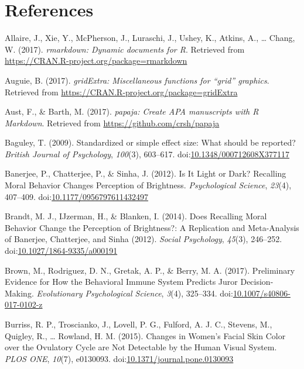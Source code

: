 \documentclass[english,floatsintext,man]{apa6}
\theoremstyle{definition}
\theoremstyle{definition}
\theoremstyle{definition}
\theoremstyle{remark}
\begin{document}
\newpage

\section{References}\label{references}

\setlength{\parindent}{-0.5in} \setlength{\leftskip}{0.5in}

\hypertarget{refs}{}
\hypertarget{ref-R-rmarkdown}{}
Allaire, J., Xie, Y., McPherson, J., Luraschi, J., Ushey, K., Atkins,
A., \ldots{} Chang, W. (2017). \emph{rmarkdown: Dynamic documents for
R}. Retrieved from \url{https://CRAN.R-project.org/package=rmarkdown}

\hypertarget{ref-R-gridExtra}{}
Auguie, B. (2017). \emph{gridExtra: Miscellaneous functions for ``grid''
graphics}. Retrieved from
\url{https://CRAN.R-project.org/package=gridExtra}

\hypertarget{ref-R-papaja}{}
Aust, F., \& Barth, M. (2017). \emph{papaja: Create APA manuscripts with
R Markdown}. Retrieved from \url{https://github.com/crsh/papaja}

\hypertarget{ref-Baguley2009}{}
Baguley, T. (2009). Standardized or simple effect size: What should be
reported? \emph{British Journal of Psychology}, \emph{100}(3), 603--617.
doi:\href{https://doi.org/10.1348/000712608X377117}{10.1348/000712608X377117}

\hypertarget{ref-Banerjee2012}{}
Banerjee, P., Chatterjee, P., \& Sinha, J. (2012). Is It Light or Dark?
Recalling Moral Behavior Changes Perception of Brightness.
\emph{Psychological Science}, \emph{23}(4), 407--409.
doi:\href{https://doi.org/10.1177/0956797611432497}{10.1177/0956797611432497}

\hypertarget{ref-Brandt2014}{}
Brandt, M. J., IJzerman, H., \& Blanken, I. (2014). Does Recalling Moral
Behavior Change the Perception of Brightness?: A Replication and
Meta-Analysis of Banerjee, Chatterjee, and Sinha (2012). \emph{Social
Psychology}, \emph{45}(3), 246--252.
doi:\href{https://doi.org/10.1027/1864-9335/a000191}{10.1027/1864-9335/a000191}

\hypertarget{ref-Brown2017}{}
Brown, M., Rodriguez, D. N., Gretak, A. P., \& Berry, M. A. (2017).
Preliminary Evidence for How the Behavioral Immune System Predicts Juror
Decision-Making. \emph{Evolutionary Psychological Science}, \emph{3}(4),
325--334.
doi:\href{https://doi.org/10.1007/s40806-017-0102-z}{10.1007/s40806-017-0102-z}

\hypertarget{ref-Burriss2015}{}
Burriss, R. P., Troscianko, J., Lovell, P. G., Fulford, A. J. C.,
Stevens, M., Quigley, R., \ldots{} Rowland, H. M. (2015). Changes in
Women's Facial Skin Color over the Ovulatory Cycle are Not Detectable by
the Human Visual System. \emph{PLOS ONE}, \emph{10}(7), e0130093.
doi:\href{https://doi.org/10.1371/journal.pone.0130093}{10.1371/journal.pone.0130093}
\end{document}
